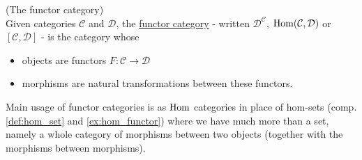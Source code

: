 \begin{definition}{(The functor category)}\\
Given categories $\mathcal{C}$ and $\mathcal{D}$, the \ul{functor category} - written $\mathcal{D}^{\mathcal{C}}$, $\textup{Hom}(\mathcal{C},
\mathcal{D})$ or $[\mathcal{C}, \mathcal{D}]$ -
is the category whose
\begin{itemize}
\item objects are functors $F : \mathcal{C} \rightarrow \mathcal{D}$
\item morphisms are natural transformations between these functors.
\end{itemize}
Main usage of functor categories is as $\textup{Hom}$ categories in place of hom-sets (comp. \ref{def:hom_set} and \ref{ex:hom_functor}) where
we have much more than a set, namely a whole category of morphisms between two objects (together with the morphisms between morphisms).
\end{definition}






















